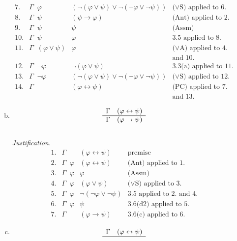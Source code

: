 \begin{enumerate}[1.]
\begin{enumerate}[(a)]
\[\begin{array}{llll}
7. & \Gamma \;\; \varphi & (\neg (\varphi \lor \psi) \lor \neg (\neg \varphi \lor \neg \psi)) & \mbox{($\lor$S) applied to 6.} \\
8. & \Gamma \;\; \psi & (\psi \rightarrow \varphi) & \mbox{(Ant) applied to 2.} \\
9. & \Gamma \;\; \psi & \psi & \mbox{(Assm)} \\
10.& \Gamma \;\; \psi & \varphi & \mbox{3.5 applied to 8. and 9.} \\
11.& \Gamma \;\; (\varphi \lor \psi) & \varphi & \mbox{($\lor$A) applied to 4.} \\
\  & \                               & \       & \mbox{and 10.} \\
12.& \Gamma \;\; \neg \varphi & \neg (\varphi \lor \psi) & \mbox{3.3(a) applied to 11.} \\
13.& \Gamma \;\; \neg \varphi & (\neg (\varphi \lor \psi) \lor \neg (\neg \varphi \lor \neg \psi)) & \mbox{($\lor$S) applied to 12.} \\
14.& \Gamma & (\varphi \leftrightarrow \psi) & \mbox{(PC) applied to 7.} \\
\  & \      & \                              & \mbox{and 13.}
\end{array}
\]
\item 
\[
\begin{array}{ll}
\Gamma & (\varphi \leftrightarrow \psi) \cr \hline
\Gamma & (\varphi \rightarrow \psi)
\end{array}
\]
\\
\textit{Justification.}
\[
\begin{array}{llll}
1. & \Gamma & (\varphi \leftrightarrow \psi) & \mbox{premise} \\
2. & \Gamma \;\; \varphi & (\varphi \leftrightarrow \psi) & \mbox{(Ant) applied to 1.} \\
3. & \Gamma \;\; \varphi & \varphi & \mbox{(Assm)} \\
4. & \Gamma \;\; \varphi & (\varphi \lor \psi) & \mbox{($\lor$S) applied to 3.} \\
5. & \Gamma \;\; \varphi & \neg (\neg \varphi \lor \neg \psi) & \mbox{3.5 applied to 2. and 4.} \\
6. & \Gamma \;\; \varphi & \psi & \mbox{3.6(d2) applied to 5.} \\
7. & \Gamma & (\varphi \rightarrow \psi) & \mbox{3.6(c) applied to 6.}
\end{array}
\]
\item 
\[
\begin{array}{ll}
\Gamma & (\varphi \leftrightarrow \psi) \cr \hline

\end{array}\]
\end{enumerate}
\end{enumerate}
